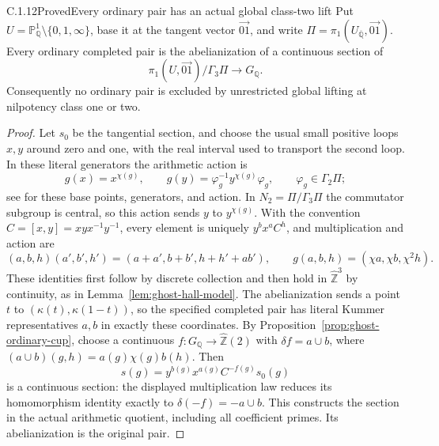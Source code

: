 \begin{result}{C.1.12}{Proved}{Every ordinary pair has an actual global class-two lift}
\label{cor:ghost-class2-lift}
Put \(U=\mathbb P^1_{\mathbb Q}\setminus\{0,1,\infty\}\),
base it at the tangent vector \(\overrightarrow{01}\), and
write \(\Pi=\pi_1(U_{\overline{\mathbb Q}},\overrightarrow{01})\).
Every ordinary completed pair is the abelianization of a
continuous section of
\[
 \pi_1(U,\overrightarrow{01})/\Gamma_3\Pi
       \longrightarrow G_{\mathbb Q}.
\]
Consequently no ordinary pair is excluded by unrestricted
global lifting at nilpotency class one or two.
\end{result}
\begin{proof}
Let \(s_0\) be the tangential section, and choose the usual
small positive loops \(x,y\) around zero and one, with the
real interval used to transport the second loop. In these
literal generators the arithmetic action is
\[
 g(x)=x^{\chi(g)},\qquad
 g(y)=\varphi_g^{-1}y^{\chi(g)}\varphi_g,
             \qquad\varphi_g\in\Gamma_2\Pi;
\]
see \cite[(12.11)--(12.15)]{GhostWickelgren2012} for these
base points, generators, and action. In \(N_2=\Pi/\Gamma_3\Pi\)
the commutator subgroup is central, so this action sends
\(y\) to \(y^{\chi(g)}\). With the convention
\(C=[x,y]=xyx^{-1}y^{-1}\), every element is uniquely
\(y^b x^a C^h\), and multiplication and action are
\[
 (a,b,h)(a',b',h')=(a+a',b+b',h+h'+ab'),\qquad
 g(a,b,h)=(\chi a,\chi b,\chi^2h).
\]
These identities first follow by discrete collection and
then hold in \(\widehat{\mathbb Z}^3\) by continuity,
as in Lemma~\ref{lem:ghost-hall-model}. The abelianization
sends a point \(t\) to \((\kappa(t),\kappa(1-t))\),
so the specified completed pair has literal Kummer
representatives \(a,b\) in exactly these coordinates.
By Proposition~\ref{prop:ghost-ordinary-cup}, choose a
continuous \(f:G_{\mathbb Q}\to\widehat{\mathbb Z}(2)\)
with \(\delta f=a\cup b\), where
\((a\cup b)(g,h)=a(g)\chi(g)b(h)\). Then
\[
 s(g)=y^{b(g)}x^{a(g)}C^{-f(g)}s_0(g)
\]
is a continuous section: the displayed multiplication law
reduces its homomorphism identity exactly to
\(\delta(-f)=-a\cup b\). This constructs the section
in the actual arithmetic quotient, including all coefficient
primes. Its abelianization is the original pair.
\end{proof}
